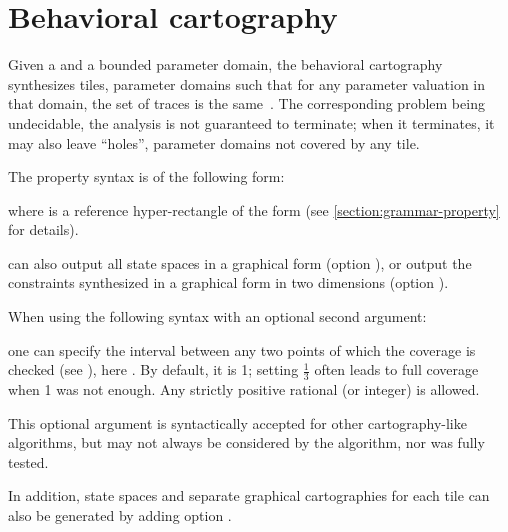 \section{Behavioral cartography}\label{ss:mode:BC}

Given a \NIPTA{} and a bounded parameter domain, the behavioral cartography~\BC{} synthesizes tiles, \ie{} parameter domains such that for any parameter valuation in that domain, the set of traces is the same~\cite{AF10}.
The corresponding problem being undecidable, the analysis is not guaranteed to terminate; when it terminates, it may also leave ``holes'', \ie{} parameter domains not covered by any tile.

The property syntax is of the following form:



\noindent{}
where  is a reference hyper-rectangle of the form  (see \cref{section:grammar-property} for details).


\imitator{} can also
output all state spaces in a graphical form (option ),
or
output the constraints synthesized in a graphical form in two dimensions (option ).

When using the following syntax with an optional second argument:


\noindent one can specify the interval between any two points of which the coverage is checked (see \cite{AF10}), here .
By default, it is 1; setting $\frac{1}{3}$ often leads to full coverage when 1 was not enough.
Any strictly positive rational (or integer) is allowed.

\begin{becareful}
	This optional argument is syntactically accepted for other cartography-like algorithms, but may not always be considered by the algorithm, nor was fully tested.
\end{becareful}

In addition, state spaces and separate graphical cartographies for each tile can also be generated by adding option .

